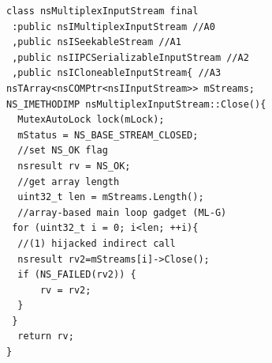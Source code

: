 \newsavebox{\firstlisting}
\begin{lrbox}{\firstlisting}
\begin{minipage}[c]{\linewidth}
\begin{verbatim}
class nsMultiplexInputStream final 
 :public nsIMultiplexInputStream //A0
 ,public nsISeekableStream //A1
 ,public nsIIPCSerializableInputStream //A2
 ,public nsICloneableInputStream{ //A3
nsTArray<nsCOMPtr<nsIInputStream>> mStreams;
NS_IMETHODIMP nsMultiplexInputStream::Close(){
  MutexAutoLock lock(mLock);
  mStatus = NS_BASE_STREAM_CLOSED;
  //set NS_OK flag
  nsresult rv = NS_OK;
  //get array length
  uint32_t len = mStreams.Length();
  //array-based main loop gadget (ML-G)
 for (uint32_t i = 0; i<len; ++i){
  //(1) hijacked indirect call
  nsresult rv2=mStreams[i]->Close();
  if (NS_FAILED(rv2)) {
      rv = rv2;
  }
 }
  return rv;
}
\end{verbatim}
\end{minipage}
\end{lrbox}



